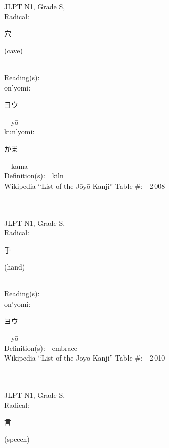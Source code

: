 \begin{multicols}{2}
{JLPT N1, Grade S, \\Radical:\ \ {\begin{CJK}{UTF8}{min} 穴 \end{CJK}} (cave) } \\
Reading(s):\ \ \\
{\hspace*{1em}}on'yomi:\ \ \\
{\hspace*{2em}}{\begin{CJK}{UTF8}{min} ヨウ \end{CJK}}\ \ y\=o\ \ \\
{\hspace*{1em}}kun'yomi:\ \ \\
{\hspace*{2em}}{\begin{CJK}{UTF8}{min} かま \end{CJK}}\ \ kama\ \ \\
Definition(s):\ \ kiln \\
Wikipedia ``List of the J\=oy\=o Kanji'' Table \#:\ \ 2\,008 \\
\ \ \\
{\fontsize{34pt}{40pt}  }\ \ \\
{JLPT N1, Grade S, \\Radical:\ \ {\begin{CJK}{UTF8}{min} 手 \end{CJK}} (hand) } \\
Reading(s):\ \ \\
{\hspace*{1em}}on'yomi:\ \ \\
{\hspace*{2em}}{\begin{CJK}{UTF8}{min} ヨウ \end{CJK}}\ \ y\=o\ \ \\
Definition(s):\ \ embrace \\
Wikipedia ``List of the J\=oy\=o Kanji'' Table \#:\ \ 2\,010 \\
\ \ \\
{\fontsize{34pt}{40pt}  }\ \ \\
{JLPT N1, Grade S, \\Radical:\ \ {\begin{CJK}{UTF8}{min} 言 \end{CJK}} (speech) } \\

\end{multicols}
